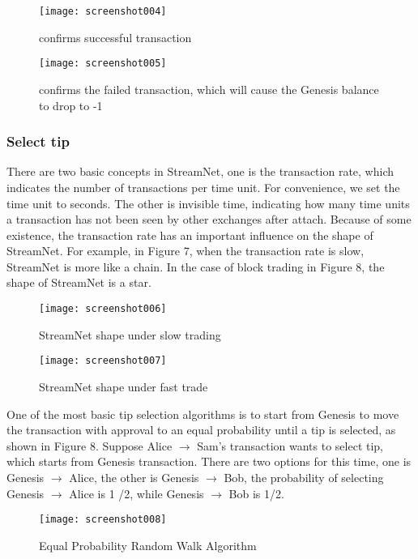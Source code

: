 \documentclass{article}
\begin{document}
\begin{figure}[H]
	\centering
	\texttt{[image: screenshot004]}
	\caption{confirms successful transaction}
	\label{simulationfigure}
\end{figure}

\begin{figure}[H]
	\centering
	\texttt{[image: screenshot005]}
	\caption{confirms the failed transaction, which will cause the Genesis balance to drop to -1}
	\label{simulationfigure}
\end{figure}

\subsubsection{Select tip}
There are two basic concepts in StreamNet, one is the transaction rate, which indicates the number of transactions per time unit. For convenience, we set the time unit to seconds. The other is invisible time, indicating how many time units a transaction has not been seen by other exchanges after attach. Because of some existence, the transaction rate has an important influence on the shape of StreamNet. For example, in Figure 7, when the transaction rate is slow, StreamNet is more like a chain. In the case of block trading in Figure 8, the shape of StreamNet is a star.

\begin{figure}[H]
	\centering
	\texttt{[image: screenshot006]}
	\caption{StreamNet shape under slow trading}
	\label{simulationfigure}
\end{figure}

\begin{figure}[H]
	\centering
	\texttt{[image: screenshot007]}
	\caption{StreamNet shape under fast trade}
	\label{simulationfigure}
\end{figure}

One of the most basic tip selection algorithms is to start from Genesis to move the transaction with approval to an equal probability until a tip is selected, as shown in Figure 8. Suppose Alice $\rightarrow$ Sam's transaction wants to select tip, which starts from Genesis transaction. There are two options for this time, one is Genesis $\rightarrow$ Alice, the other is Genesis $\rightarrow$ Bob, the probability of selecting Genesis $\rightarrow$ Alice is 1 /2, while Genesis $\rightarrow$ Bob is 1/2. 

\begin{figure}[H]
	\centering
	\texttt{[image: screenshot008]}
	\caption{Equal Probability Random Walk Algorithm}
	\label{simulationfigure}
\end{figure}
\end{document}
